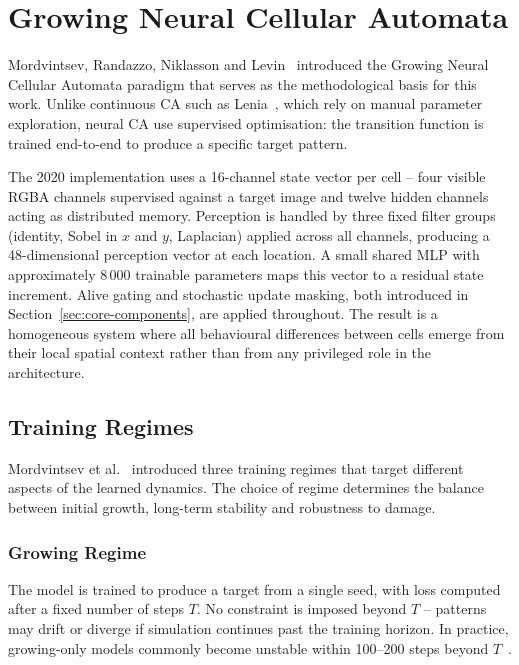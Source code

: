 \section{Growing Neural Cellular Automata}

Mordvintsev, Randazzo, Niklasson and Levin~\cite{Mordvintsev2020} introduced the
Growing Neural Cellular Automata paradigm that serves as the methodological basis for
this work. Unlike continuous CA such as Lenia~\cite{Chan2019}, which rely on manual
parameter exploration, neural CA use supervised optimisation: the transition function
is trained end-to-end to produce a specific target pattern.

The 2020 implementation uses a 16-channel state vector per cell -- four visible RGBA
channels supervised against a target image and twelve hidden channels acting as
distributed memory. Perception is handled by three fixed filter groups (identity,
Sobel in $x$ and $y$, Laplacian) applied across all channels, producing a
48-dimensional perception vector at each location. A small shared MLP with
approximately 8\,000 trainable parameters maps this vector to a residual state
increment. Alive gating and stochastic update masking, both introduced in
Section~\ref{sec:core-components}, are applied throughout. The result is a
homogeneous system where all behavioural differences between cells emerge from their
local spatial context rather than from any privileged role in the architecture.

\clearpage

\subsection{Training Regimes}

Mordvintsev et al.~\cite{Mordvintsev2020} introduced three training regimes that
target different aspects of the learned dynamics. The choice of regime determines
the balance between initial growth, long-term stability and robustness to damage.

\subsubsection{Growing Regime}

The model is trained to produce a target from a single seed, with loss computed after
a fixed number of steps $T$. No constraint is imposed beyond $T$ -- patterns may
drift or diverge if simulation continues past the training horizon. In practice,
growing-only models commonly become unstable within 100--200 steps beyond
$T$~\cite{Mordvintsev2020}.

